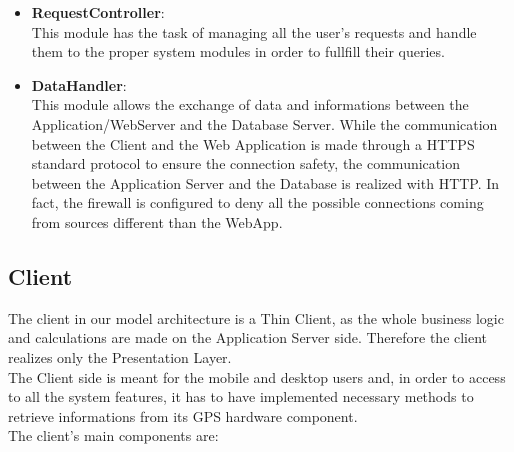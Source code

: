 \documentclass[numbers=noenddot, 12pt, a4paper, oneside]{scrbook}
\begin{document}
\begin{itemize}
	\item \textbf{RequestController}:\\\newline
	This module has the task of managing all the user's requests and handle them to the proper system modules in order to fullfill their queries.\\
	
	\item \textbf{DataHandler}:\\\newline
	This module allows the exchange of data and informations between the Application/WebServer and the Database Server. While the communication between the Client and the Web Application is made through a HTTPS standard protocol to ensure the connection safety, the communication between the Application Server and the Database is realized with HTTP. In fact, the firewall is configured to deny all the possible connections coming from sources different than the WebApp.\\
	
\end{itemize}

\subsection*{Client}

The client in our model architecture is a Thin Client, as the whole business logic and calculations are made on the Application Server side. Therefore the client realizes only the Presentation Layer.\\

The Client side is meant for the mobile and desktop users and, in order to access to all the system features, it has to have implemented necessary methods to retrieve informations from its GPS hardware component.\\

The client's main components are:
\end{document}
